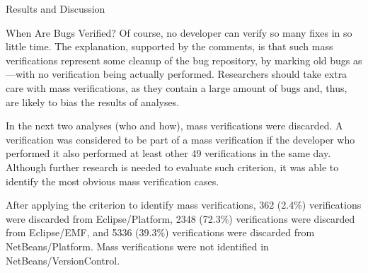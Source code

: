 \begin{section}{Results and Discussion}
\begin{subsection}{When Are Bugs Verified?}
	Of course, no developer can verify so many fixes in so little time. The explanation, supported by the comments, is that such mass verifications represent some cleanup of the bug repository, by marking old bugs as \VERIFIED---with no verification being actually performed. Researchers should take extra care with mass verifications, as they contain a large amount of bugs and, thus, are likely to bias the results of analyses.
	
	In the next two analyses (who and how), mass verifications were discarded. A verification was considered to be part of a mass verification if the developer who performed it also performed at least other 49 verifications in the same day. Although further research is needed to evaluate such criterion, it was able to identify the most obvious mass verification cases.
	
	After applying the criterion to identify mass verifications, 362 (2.4\%) verifications were discarded from Eclipse/Platform, 2348 (72.3\%) verifications were discarded from Eclipse/EMF, and 5336 (39.3\%) verifications were discarded from NetBeans/Platform. Mass verifications were not identified in NetBeans/VersionControl.
	
	
	
	
	

\end{subsection}
\end{section}
